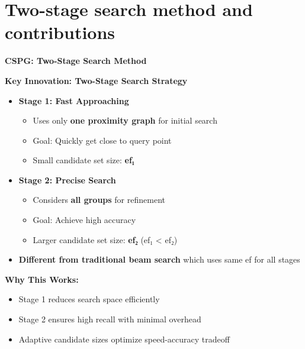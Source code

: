\section{Two-stage search method and contributions}%
\begin{frame}
\begin{center}
\Large \textbf{CSPG: Two-Stage Search Method}
\end{center}

\vspace{0.3cm}

\textbf{Key Innovation: Two-Stage Search Strategy}

\begin{itemize}
    \item \textbf{Stage 1: Fast Approaching}
    \begin{itemize}
        \item Uses only \textbf{one proximity graph} for initial search
        \item Goal: Quickly get close to query point
        \item Small candidate set size: \textbf{ef₁}
    \end{itemize}
    
    \item \textbf{Stage 2: Precise Search}
    \begin{itemize}
        \item Considers \textbf{all groups} for refinement
        \item Goal: Achieve high accuracy
        \item Larger candidate set size: \textbf{ef₂} (ef₁ < ef₂)
    \end{itemize}
    
    \item \textbf{Different from traditional beam search} which uses same ef for all stages
\end{itemize}

\vspace{0.3cm}

\textbf{Why This Works:}
\begin{itemize}
    \item Stage 1 reduces search space efficiently
    \item Stage 2 ensures high recall with minimal overhead
    \item Adaptive candidate sizes optimize speed-accuracy tradeoff
\end{itemize}
\end{frame}%
